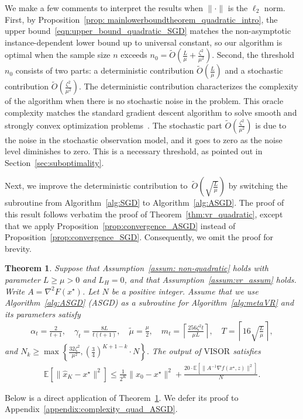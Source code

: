 \documentclass[11pt,twoside]{article}
\numberwithin{equation}{section}
\newcommand{\EE}{\mathbb{E}}
\newcommand{\ceil}[1]{\left \lceil #1 \right \rceil }
\newcommand{\1}{\mathbf{1}}
\newtheorem{theorem}{Theorem}[section]
\newcommand{\paren}[1]{ \left( #1 \right) }
\theoremstyle{remark}
\theoremstyle{plain}
\newcommand{\liph}{L_H}
\newcommand{\algname}{\mathrm{VISOR}}
\begin{document}
We make a few comments to interpret the results when $\|\cdot\|$ is the $\ell_2$ norm. First, by Proposition~\ref{prop: mainlowerboundtheorem_quadratic_intro}, the upper bound~\eqref{eqn:upper_bound_quadratic_SGD} matches the non-asymptotic instance-dependent lower bound up to universal constant, so our algorithm is optimal when the sample size $n$ exceeds $n_0 = \tilde O\left(\frac{L}{\mu} + \frac{\zeta^2}{\mu^2}\right)$.  Second,  the threshold $n_0$ consists of two parts: a deterministic contribution $\tilde O\paren{\frac{L}{\mu}}$  and a stochastic contribution $\tilde O\left(\frac{\zeta^2}{\mu^2}\right)$. The deterministic contribution characterizes the complexity of the algorithm when there is no stochastic noise in the problem. This oracle complexity matches the standard gradient descent algorithm to solve smooth and strongly convex optimization problems~\cite{nesterov2018lectures}. The stochastic part $\tilde O(\frac{\zeta^2}{\mu^2})$ is due to the noise in the stochastic observation model, and it goes to zero as the noise level diminishes to zero.  This is a necessary threshold, as pointed out in Section~\ref{sec:suboptimality}. 

Next, we improve the deterministic contribution to~$\tilde O\left(\sqrt{\frac{L}{\mu}} \right)$ by switching the subroutine from Algorithm~\ref{alg:SGD} to Algorithm~\ref{alg:ASGD}. The proof of this result follows verbatim the proof of Theorem~\ref{thm:vr_quadratic}, except that we apply Proposition~\ref{prop:convergence_ASGD} instead of Proposition~\ref{prop:convergence_SGD}. Consequently, we omit the proof for brevity.
\begin{theorem}\label{thm:vr_quadratic_ac}
Suppose that  Assumption~\ref{assum: non-quadratic} holds with parameter $L \ge \mu >0$ and $\liph = 0$, and that Assumption~\ref{assum:vr_assum} holds. Write $A = \nabla^2 F(x^\star)$. Let $N$ be a positive integer. Assume that we use Algorithm~\ref{alg:ASGD} (ASGD) as a subroutine for Algorithm~\ref{alg:metaVR} and its parameters satisfy
\begin{align*}
	\alpha_t = \frac{2}{t+1}, \quad \gamma_t = \frac{8L}{ t(t+1)}, \quad \tilde \mu = \frac{\mu}{2}, \quad m_t = \ceil{\frac{256\zeta^2  t}{\mu L}},  \quad T = \ceil{16\sqrt{\frac{L}{ \mu}}},
\end{align*}
and $ N_k \ge \max \left\{\frac{32\zeta^2}{\mu^2}, \left(\frac{3}{4}\right)^{K+1-k} \cdot N \right\}.$ 
The output of $\algname$ satisfies
\begin{align*}
	\EE[\|\widehat x_K - x^\star\|^2] \le \frac{1}{2^K} \|x_0 - x^\star\|^2  + \frac{20 \cdot  \EE[\|A^{-1} \nabla f(x^\star, z)\|^2]}{N} .
\end{align*}
\end{theorem}
Below is a direct application of Theorem~\ref{thm:vr_quadratic_ac}. We defer its proof to Appendix~\ref{appendix:complexity_quad_ASGD}.
\end{document}
